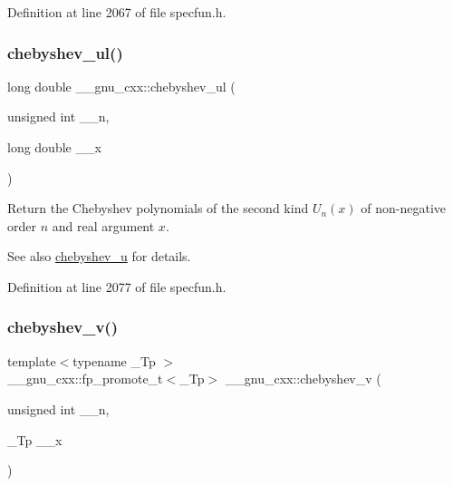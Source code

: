 Definition at line 2067 of file specfun.\+h.

\mbox{\label{group__gnu__math__spec__func_ga11ec202d6aacafba1182e962ecf02978}} 
\subsubsection{\texorpdfstring{chebyshev\+\_\+ul()}{chebyshev\_ul()}}
{\footnotesize\ttfamily long double \+\_\+\+\_\+gnu\+\_\+cxx\+::chebyshev\+\_\+ul (\begin{DoxyParamCaption}\item[{unsigned int}]{\+\_\+\+\_\+n,  }\item[{long double}]{\+\_\+\+\_\+x }\end{DoxyParamCaption})\hspace{0.3cm}{\ttfamily [inline]}}

Return the Chebyshev polynomials of the second kind $ U_n(x) $ of non-\/negative order $ n $ and real argument $ x $.

\begin{DoxySeeAlso}{See also}
\hyperlink{group__gnu__math__spec__func_gafa90c06bdedb8459f20576297cf1608f}{chebyshev\+\_\+u} for details. 
\end{DoxySeeAlso}


Definition at line 2077 of file specfun.\+h.

\mbox{\label{group__gnu__math__spec__func_ga32b7decd0002f542d2c9187c5f0846c6}} 
\subsubsection{\texorpdfstring{chebyshev\+\_\+v()}{chebyshev\_v()}}
{\footnotesize\ttfamily template$<$typename \+\_\+\+Tp $>$ \\
\+\_\+\+\_\+gnu\+\_\+cxx\+::fp\+\_\+promote\+\_\+t$<$\+\_\+\+Tp$>$ \+\_\+\+\_\+gnu\+\_\+cxx\+::chebyshev\+\_\+v (\begin{DoxyParamCaption}\item[{unsigned int}]{\+\_\+\+\_\+n,  }\item[{\+\_\+\+Tp}]{\+\_\+\+\_\+x }\end{DoxyParamCaption})\hspace{0.3cm}{\ttfamily [inline]}}

